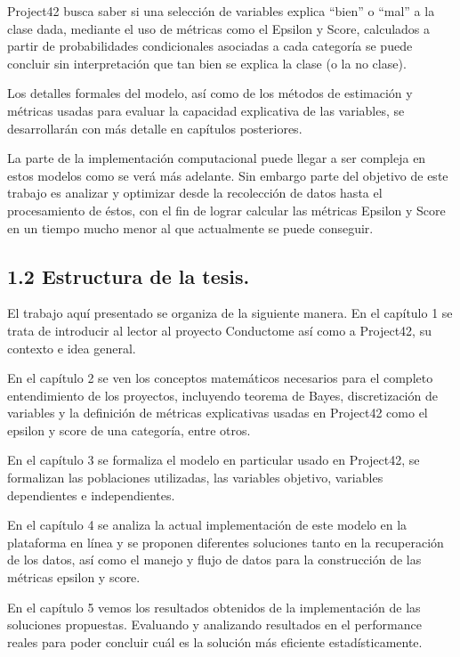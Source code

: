 \documentclass[
 12pt,
 letterpaper,
]{article}
\theoremstyle{teoremaBreak}
\theoremstyle{plain}
\theoremstyle{definition}
\begin{document}
Project42 busca saber si una selección de variables explica ``bien'' o
``mal'' a la clase dada, mediante el uso de métricas como el Epsilon y
Score, calculados a partir de probabilidades condicionales asociadas a
cada categoría se puede concluir sin interpretación que tan bien se
explica la clase (o la no clase).

Los detalles formales del modelo, así como de los métodos de estimación
y métricas usadas para evaluar la capacidad explicativa de las
variables, se desarrollarán con más detalle en capítulos posteriores.

La parte de la implementación computacional puede llegar a ser compleja
en estos modelos como se verá más adelante. Sin embargo parte del
objetivo de este trabajo es analizar y optimizar desde la recolección de
datos hasta el procesamiento de éstos, con el fin de lograr calcular las
métricas Epsilon y Score en un tiempo mucho menor al que actualmente se
puede conseguir.

\subsection{1.2 Estructura de la tesis.}\label{estructura-de-la-tesis.}

El trabajo aquí presentado se organiza de la siguiente manera. En el
capítulo 1 se trata de introducir al lector al proyecto Conductome así
como a Project42, su contexto e idea general.

En el capítulo 2 se ven los conceptos matemáticos necesarios para el
completo entendimiento de los proyectos, incluyendo teorema de Bayes,
discretización de variables y la definición de métricas explicativas
usadas en Project42 como el epsilon y score de una categoría, entre
otros.

En el capítulo 3 se formaliza el modelo en particular usado en
Project42, se formalizan las poblaciones utilizadas, las variables
objetivo, variables dependientes e independientes.

En el capítulo 4 se analiza la actual implementación de este modelo en
la plataforma en línea y se proponen diferentes soluciones tanto en la
recuperación de los datos, así como el manejo y flujo de datos para la
construcción de las métricas epsilon y score.

En el capítulo 5 vemos los resultados obtenidos de la implementación de
las soluciones propuestas. Evaluando y analizando resultados en el
performance reales para poder concluir cuál es la solución más eficiente
estadísticamente.
\end{document}
